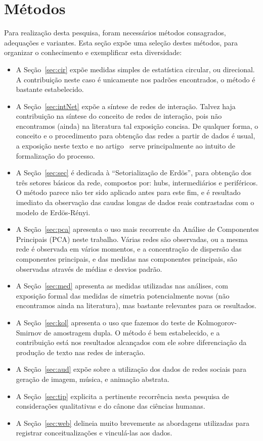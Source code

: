 \documentclass[a4paper,openright,12pt]{report} %
\begin{document}
\chapter{Métodos}\label{sec:met}
Para realização desta pesquisa, foram
necessários métodos consagrados, adequações
e variantes.
Esta seção expõe uma seleção destes métodos,
para organizar o conhecimento
e exemplificar esta diversidade:
\begin{itemize}
    \item A Seção~\ref{sec:cir} expõe medidas simples
de estatística circular, ou direcional.
A contribuição neste caso é unicamente nos
padrões encontrados, o método é bastante estabelecido.
    \item A Seção~\ref{sec:intNet} expõe a síntese de redes
        de interação. Talvez haja contribuição na síntese
        do conceito de redes de interação, pois não 
        encontramos (ainda) na literatura tal exposição
        concisa. De qualquer forma, o conceito e o procedimento
        para obtenção das redes a partir de dados é usual,
        a exposição neste texto e no artigo~\cite{timeS} serve
        principalmente ao intuito de formalização do
        processo.
    \item A Seção~\ref{sec:sec} é dedicada à ``Setorialização de Erdös'', para obtenção dos três setores básicos da rede, compostos por: hubs, intermediários e periféricos. 
        O método parece não ter sido aplicado antes para este fim, e é resultado imediato da observação das caudas longas de dados reais contrastadas com o modelo de Erdös-Rényi.~\cite{3setores}
    \item A Seção~\ref{sec:pca} apresenta o uso mais recorrente da Análise de Componentes Principais (PCA) neste trabalho. Várias redes são observadas, ou a mesma rede é observada em vários momentos, e a concentração
        de dispersão das componentes principais, e das medidas nas componentes principais, são observadas através de médias e desvios padrão.
    \item A Seção~\ref{sec:med} apresenta as medidas utilizadas nas análises, com exposição formal das medidas de simetria potencialmente novas (não encontramos ainda na literatura), mas bastante relevantes para os resultados.
    \item A Seção~\ref{sec:kol} apresenta o uso que fazemos do teste de Kolmogorov-Smirnov de amostragem dupla. O método é bem estabelecido, e a contribuição está nos resultados alcançados com ele sobre diferenciação 
        da produção de texto nas redes de interação.
    \item A Seção~\ref{sec:aud} expõe sobre a utilização dos dados de redes sociais para geração de imagem, música, e animação abstrata.
    \item A Seção~\ref{sec:tip} explicita a pertinente recorrência nesta pesquisa de considerações qualitativas e do cânone das ciências humanas.
    \item A Seção~\ref{sec:web} delineia muito brevemente as abordagens
        utilizadas para registrar conceitualizações e vinculá-las
        aos dados.
\end{itemize}
\end{document}
